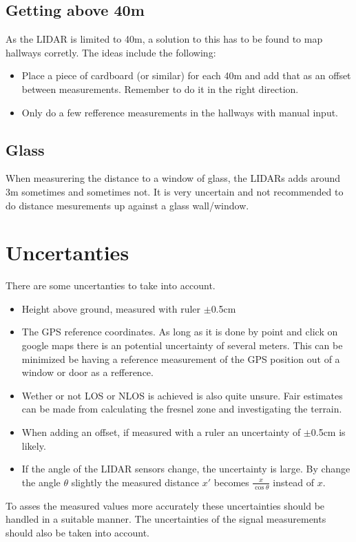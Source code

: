 \documentclass[a4paper,twoside, 12pt]{article}
\begin{document}
\subsection{Getting above 40m}
As the LIDAR is limited to 40m, a solution to this has to be found to map hallways corretly. The ideas include the following:
\begin{itemize}
	\item Place a piece of cardboard (or similar) for each 40m and add that as an offset between measurements. Remember to do it in the right direction.
	\item Only do a few refference measurements in the hallways with manual input.
\end{itemize}

\subsection{Glass}
When measurering the distance to a window of glass, the LIDARs adds around 3m sometimes and sometimes not. It is very uncertain and not recommended to do distance mesurements up against a glass wall/window.


\section{Uncertanties}
There are some uncertanties to take into account. 
\begin{itemize}
	\item Height above ground, measured with ruler $\pm$0.5cm
	\item The GPS reference coordinates. As long as it is done by point and click on google maps there is an potential uncertainty of several meters. This can be minimized be having a reference measurement of the GPS position out of a window or door as a refference. 
	\item Wether or not LOS or NLOS is achieved is also quite unsure. Fair estimates can be made from calculating the fresnel zone and investigating the terrain.
	\item When adding an offset, if measured with a ruler an uncertainty of $\pm$0.5cm is likely.
	\item If the angle of the LIDAR sensors change, the uncertainty is large. By change the angle $\theta$ slightly the measured distance $x'$ becomes $\frac{x}{\cos \theta}$ instead of $x$. 
\end{itemize}
To asses the measured values more accurately these uncertainties should be handled in a suitable manner. The uncertainties of the signal measurements should also be taken into account.
\end{document}

